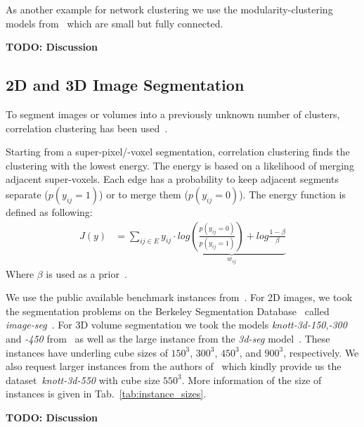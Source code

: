 \documentclass[10pt,twocolumn,letterpaper]{article}
\begin{document}
As another example for network clustering we use the modularity-clustering models from~\cite{kappes_2014_benchmark_arxiv} which are small but fully connected.

{\color{red}\textbf{TODO: Discussion}}



\subsection{2D and 3D Image Segmentation}
To segment images or volumes into a previously
unknown number of clusters, correlation clustering
has been used~\cite{andres_2011_iccv,kroeger_2012_eccv}.

Starting from a super-pixel/-voxel segmentation,
correlation clustering finds the clustering with the lowest energy.
The energy is based on a likelihood of merging adjacent super-voxels.
Each edge has a probability to keep adjacent segments separate ($p(y_{ij} =1)$)
or to merge them ($p(y_{ij} = 0)$).
The energy function is defined as following:
\begin{align}
 J(y)  &= \sum_{ij \in E} y_{ij}\cdot \underbrace{  log\left( \frac{p(y_{ij} =0)}{p(y_{ij} =1)}\right) + log \frac{1-\beta}{\beta}  }_{w_{ij}}
\end{align}
Where $\beta$ is used as a prior~\cite{andres_2011_iccv}.

We use the public available benchmark instances from~\cite{kappes_2013_benchmark_cvpr,kappes_2014_benchmark_arxiv}.
For 2D images, we took the segmentation problems on the Berkeley Segmentation Database~\cite{martin_2001} called \emph{image-seg}~\cite{andres_2011_iccv,kappes_2013_benchmark_cvpr}.
For 3D volume segmentation we took the models \emph{knott-3d-150},\emph{-300} and \emph{-450} from~\cite{kroeger_2012_eccv,kappes_2014_benchmark_arxiv} as well as the large
instance from the \emph{3d-seg} model~\cite{andres_2011_iccv,kappes_2013_benchmark_cvpr}. These instances have underling cube sizes of  $150^3$, $300^3$, $450^3$, and $900^3$, respectively.
We also request larger instances from the authors of~\cite{kroeger_2012_eccv} which kindly provide us the dataset~\emph{knott-3d-550} with cube size  $550^3$.
More information of the size of instances is given in Tab.~\ref{tab:instance_sizes}.

{\color{red}\textbf{TODO: Discussion}}
\end{document}
